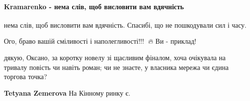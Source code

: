  
 
 
 
 
\paragraph{Kramarenko - нема слів, щоб висловити вам вдячність}

\begin{itemize}
 
нема слів, щоб висловити вам вдячність. Спасибі, що не пошкодували сил і часу.

 
Ого, браво вашій сміливості і наполегливості!!!👏 🔥 Ви - приклад!

 

дякую, Оксано, за коротку новелу зі щасливим фіналом, хоча очікувала на тривалу
повість чи навіть роман; чи не знаєте, у власника мережа чи єдина торгова
точка?

\begin{itemize}
 
\textbf{Tetyana Zemerova} На Кінному ринку є.

 

\end{itemize}
\end{itemize}
